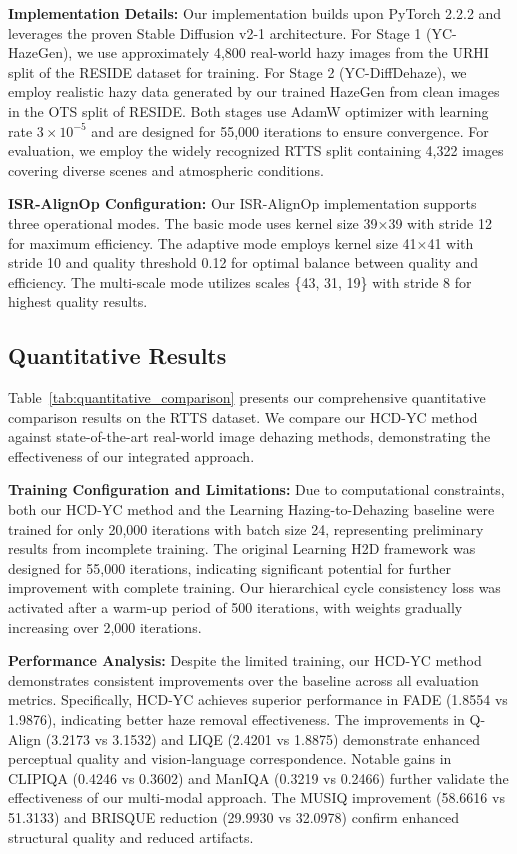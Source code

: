 \documentclass{article}
\begin{document}
\noindent\textbf{Implementation Details:}
Our implementation builds upon PyTorch 2.2.2 and leverages the proven Stable Diffusion v2-1 architecture. For Stage 1 (YC-HazeGen), we use approximately 4,800 real-world hazy images from the URHI split of the RESIDE dataset for training. For Stage 2 (YC-DiffDehaze), we employ realistic hazy data generated by our trained HazeGen from clean images in the OTS split of RESIDE. Both stages use AdamW optimizer with learning rate $3 \times 10^{-5}$ and are designed for 55,000 iterations to ensure convergence. For evaluation, we employ the widely recognized RTTS split containing 4,322 images covering diverse scenes and atmospheric conditions.

\noindent\textbf{ISR-AlignOp Configuration:}
Our ISR-AlignOp implementation supports three operational modes. The basic mode uses kernel size 39×39 with stride 12 for maximum efficiency. The adaptive mode employs kernel size 41×41 with stride 10 and quality threshold 0.12 for optimal balance between quality and efficiency. The multi-scale mode utilizes scales \{43, 31, 19\} with stride 8 for highest quality results.

\subsection{Quantitative Results}

Table~\ref{tab:quantitative_comparison} presents our comprehensive quantitative comparison results on the RTTS dataset. We compare our HCD-YC method against state-of-the-art real-world image dehazing methods, demonstrating the effectiveness of our integrated approach.

\noindent\textbf{Training Configuration and Limitations:}
Due to computational constraints, both our HCD-YC method and the Learning Hazing-to-Dehazing baseline were trained for only 20,000 iterations with batch size 24, representing preliminary results from incomplete training. The original Learning H2D framework was designed for 55,000 iterations, indicating significant potential for further improvement with complete training. Our hierarchical cycle consistency loss was activated after a warm-up period of 500 iterations, with weights gradually increasing over 2,000 iterations.

\noindent\textbf{Performance Analysis:}
Despite the limited training, our HCD-YC method demonstrates consistent improvements over the baseline across all evaluation metrics. Specifically, HCD-YC achieves superior performance in FADE (1.8554 vs 1.9876), indicating better haze removal effectiveness. The improvements in Q-Align (3.2173 vs 3.1532) and LIQE (2.4201 vs 1.8875) demonstrate enhanced perceptual quality and vision-language correspondence. Notable gains in CLIPIQA (0.4246 vs 0.3602) and ManIQA (0.3219 vs 0.2466) further validate the effectiveness of our multi-modal approach. The MUSIQ improvement (58.6616 vs 51.3133) and BRISQUE reduction (29.9930 vs 32.0978) confirm enhanced structural quality and reduced artifacts.
\end{document}
